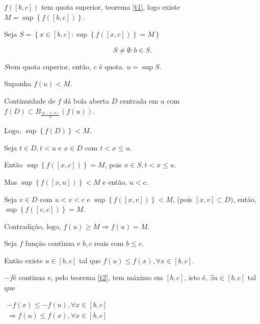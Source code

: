 \documentclass{book}
\begin{document}
\begin{dem}

$f\left( {\left[ {b,c} \right]} \right)$ tem quota superior, teorema \ref{t1},
logo existe $M = \sup \left\{ {f\left( {\left[ {b,c} \right]} \right)}
\right\}$.

Seja $S = \left\{ {x \in \left[ {b,c} \right]:\sup \left\{ {f\left( {\left[
{x,c} \right]} \right)} \right\} = M} \right\}$

\[
S \ne \emptyset :b \in S.
\]

$S$tem quota superior, ent\~ao, $c$ \'{e} quota. $u = \sup S$.

Suponha $f\left( u \right) < M$.

Continuidade de $f$ d\'a bola aberta $D$ centrada em $u$ com $f\left( D
\right) \subset B_{\frac{M - f\left( u \right)}{2}} \left( {f\left( u
\right)} \right)$.

Logo, $\sup \left\{ {f\left( D \right)} \right\} < M$.

Seja $t \in D,t < u$ e $x \in D$ com $t < x \leqslant u$.

Ent\~ao $\sup \left\{ {f\left( {\left[ {x,c} \right]} \right)} \right\} =
M$, pois $x \in S,t < x \leqslant u$.

Mas $\sup \left\{ {f\left( {\left[ {x,u} \right]} \right)} \right\} < M$ e
ent\~ao, $u < c$.

Seja $v \in D$ com $u < v < c$ e $\sup \left\{ {f\left( {\left[ {x,v}
\right]} \right)} \right\} < M$, (pois $\left[ {x,v} \right] \subset D)$,
ent\~ao, $\sup \left\{ {f\left( {\left[ {v,c} \right]} \right)} \right\} =
M$.

Contradi\c c\~ao, logo, $f\left( u \right) \geqslant M \Rightarrow
f\left( u \right) = M$.

\end{dem}

\begin{teo}

Seja $f$ fun\c c\~ao cont\'{\i}nua e $b,c$ reais com $b \leqslant c$.

Ent\~ao existe $u \in \left[ {b,c} \right]$ tal que $f\left( u \right)
\leqslant f\left( x \right),\forall x \in \left[ {b,c} \right]$.

\end{teo}

\begin{dem}

$ - f$\'{e} continua e, pelo teorema \ref{t2}, tem m\'aximo em $\left[ {b,c}
\right]$, isto \'{e}, $\exists u \in \left[ {b,c} \right]$ tal que

$\begin{array}{l}
- f\left( x \right) \leqslant - f\left( u \right),\forall x \in \left[
{b,c} \right] \\
\Rightarrow f\left( u \right) \leqslant f\left( x \right),\forall x \in
\left[ {b,c} \right] \\
\end{array}$

\end{dem}
\end{document}
